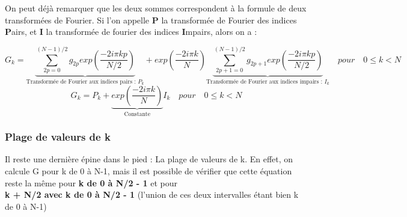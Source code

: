 \documentclass{article}
\begin{document}
On peut déjà remarquer que les deux sommes correspondent à la formule de deux transformées de Fourier. Si l'on appelle \textbf{P} la transformée de Fourier des indices \textbf{P}airs, et \textbf{I} la transformée de fourier des indices \textbf{I}mpairs, alors on a :

\begin{equation}
	G_{k} = \underbrace{\sum_{2p = 0}^{(N-1)/2}g_{2p} exp(\frac{-2i\pi kp}{N/2})}_\text{Transformée de Fourier aux indices pairs : $P_{k}$} + exp(\frac{-2i\pi k}{N})\underbrace{\sum_{2p+1 = 0}^{(N-1)/2}g_{2p+1} exp(\frac{-2i\pi k	p}{N/2})}_\text{Transformée de Fourier aux indices impairs : $I_{k}$} \quad pour \quad 0 \leq k < N
\end{equation}
\begin{equation}
	G_{k} = P_{k} + \underbrace{exp(\frac{-2i\pi k}{N})}_\text{Constante} I_{k} \quad pour \quad 0 \leq k < N
\end{equation}

\subsubsection{Plage de valeurs de k}

Il reste une dernière épine dans le pied : La plage de valeurs de k. En effet, on calcule G pour k de 0 à N-1, mais il est possible de vérifier que cette équation reste la même pour \textbf{k de 0 à N/2 - 1} et pour \\\textbf{k + N/2 avec k de 0 à N/2 - 1} (l'union de ces deux intervalles étant bien k de 0 à N-1)\\~\\
\end{document}
